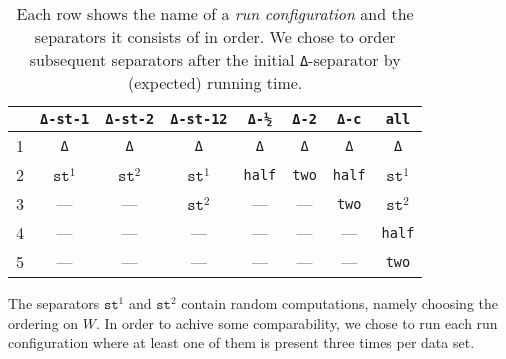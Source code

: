 \begin{table}
\centering
\begin{tabular}{lccccccc}
\toprule
  & \texttt{Δ-st-1} & \texttt{Δ-st-2} & \texttt{Δ-st-12}	& \texttt{Δ-½}	& \texttt{Δ-2} 	& \texttt{Δ-c}	& \texttt{all}  	\\
\midrule
1 & \texttt{Δ}      & \texttt{Δ}      & \texttt{Δ}      	& \texttt{Δ}	& \texttt{Δ}	& \texttt{Δ}	& \texttt{Δ} 		\\
2 & $\texttt{st}^1$ & $\texttt{st}^2$ & $\texttt{st}^1$ 	& \texttt{half}	& \texttt{two} 	& \texttt{half}	& $\texttt{st}^1$  	\\
3 & —               & —               & $\texttt{st}^2$ 	& —    			& —   		   	& \texttt{two}  & $\texttt{st}^2$  	\\
4 & —               & —               & —               	& —    			& —   		   	& —      		& \texttt{half}     \\
5 & —               & —               & —               	& —    			& — 			& —      		& \texttt{two}      \\
\bottomrule
\end{tabular}
\vspace{10pt}
\caption[Run Configurations]{Each row shows the name of a \textit{run configuration} and the separators it consists of in order.
We chose to order subsequent separators after the initial \texttt{Δ}-separator by (expected) running time.}
\label{tab:run_configurations}
\end{table}

The separators $\texttt{st}^{1}$ and $\texttt{st}^{2}$ contain random computations, namely choosing the ordering on $W$.
In order to achive some comparability, we chose to run each run configuration where at least one of them is present three times per data set.
